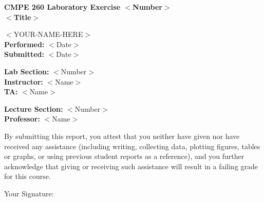 \documentclass[letterpaper]{article} %
\begin{document}
	
	\begin{adjustwidth*}{2cm}{2cm} %
		
		\begin{center}
		\textbf{CMPE 260 Laboratory Exercise $<$Number$>$ \\ %
				\vspace{0.5cm} 
				$<$Title$>$} %
		\end{center}
	
		\vspace{12cm} %
		
		\tabto{8cm} $<$YOUR-NAME-HERE$>$ \\ %
		\tabto{8cm} \textbf{Performed: }$<$Date$>$ \\ %
		\tabto{8cm} \textbf{Submitted: }$<$Date$>$  %
				
		\tabto{8cm} \textbf{Lab Section: }$<$Number$>$ \\ %
		\tabto{8cm} \textbf{Instructor: }$<$Name$>$ \\ %
		\tabto{8cm} \textbf{TA: }$<$Name$>$ %
				
		\tabto{8cm} \textbf{Lecture Section: }$<$Number$>$ \\ %
		\tabto{8cm} \textbf{Professor: }$<$Name$>$ %
		
		\vspace{0.5cm}
		
		\noindent By submitting this report, you attest that you neither have given nor have received any assistance (including writing, collecting data, plotting figures, tables or graphs, or using previous student reports as a reference), and you further acknowledge that giving or receiving such assistance will result in a failing grade for this course.
		
		\vspace{0.5cm}
		
		\tabto{1.5cm} Your Signature: \hrulefill %
	
	\end{adjustwidth*}	
	
\end{document}
